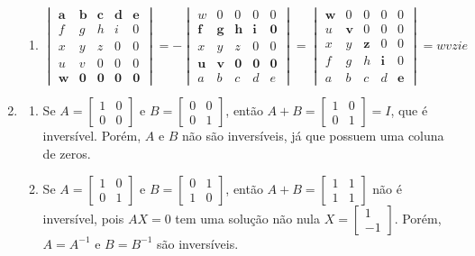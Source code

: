 \documentclass[12pt,a4paper]{article}
\begin{document}
\begin{enumerate}
\begin{enumerate}
\item 
$\begin{vmatrix}
\textbf{a} & \textbf{b} & \textbf{c} & \textbf{d} & \textbf{e} \\
f & g & h & i & 0 \\
x & y & z & 0 & 0 \\
u & v & 0 & 0 & 0 \\
\textbf{w} & \textbf{0} & \textbf{0} & \textbf{0} & \textbf{0}
\end{vmatrix}
= -
\begin{vmatrix}
w & 0 & 0 & 0 & 0 \\
\textbf{f} & \textbf{g} & \textbf{h} & \textbf{i} & \textbf{0} \\
x & y & z & 0 & 0 \\
\textbf{u} & \textbf{v} & \textbf{0} & \textbf{0} & \textbf{0} \\
a & b & c & d & e
\end{vmatrix}
=
\begin{vmatrix}
\textbf{w} & 0 & 0 & 0 & 0 \\
u & \textbf{v} & 0 & 0 & 0 \\
x & y & \textbf{z} & 0 & 0 \\
f & g & h & \textbf{i} & 0 \\
a & b & c & d & \textbf{e}
\end{vmatrix}
= wvzie$
\end{enumerate}

\item \begin{enumerate}
\item Se
$A = \begin{bmatrix}
1 & 0 \\
0 & 0
\end{bmatrix}$
e 
$B = \begin{bmatrix}
0 & 0 \\
0 & 1
\end{bmatrix}$, então
$A + B
= \begin{bmatrix}
1 & 0 \\
0 & 1
\end{bmatrix} = I$, que é inversível. Porém, $A$ e $B$ não são inversíveis, já que possuem uma coluna de zeros.

\item Se
$A = \begin{bmatrix}
1 & 0 \\
0 & 1
\end{bmatrix}$
e 
$B = \begin{bmatrix}
0 & 1 \\
1 & 0
\end{bmatrix}$, então
$A + B
= \begin{bmatrix}
1 & 1 \\
1 & 1
\end{bmatrix}$ não é inversível, pois $AX = 0$ tem uma solução não nula $X = \begin{bmatrix}
1\\-1
\end{bmatrix}$. Porém, $A = A^{-1}$ e $B = B^{-1}$ são inversíveis.


\end{enumerate}
\end{enumerate}
\end{document}
